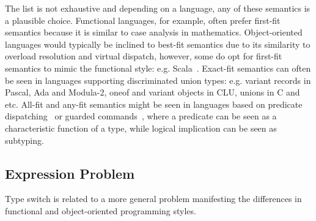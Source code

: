 \noindent
The list is not exhaustive and depending on a language, any of these semantics 
is a plausible choice. Functional languages, for example, often prefer 
first-fit semantics because it is similar to case analysis in mathematics. 
Object-oriented languages would typically be inclined to best-fit semantics due 
to its similarity to overload resolution and virtual dispatch, however, some 
do opt for first-fit semantics to mimic the functional style: e.g. Scala~\cite{Scala2nd}. 
Exact-fit semantics can often be seen in languages supporting discriminated 
union types: e.g. variant records in Pascal, Ada and Modula-2, oneof and variant 
objects in CLU, unions in C and \Cpp{} etc.
All-fit and any-fit semantics might be seen in languages based on predicate 
dispatching~\cite{ErnstKC98} or guarded commands~\cite{EWD:EWD472}, where a 
predicate can be seen as a characteristic function of a type, while logical 
implication can be seen as subtyping.

\subsection{Expression Problem}

Type switch is related to a more general problem manifesting the differences 
in functional and object-oriented programming styles.

%

